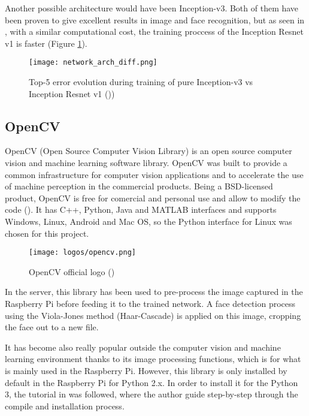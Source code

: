 	Another possible architecture would have been Inception-v3. Both of them have been proven to give excellent results in image and face recognition, but as seen in \cite{inception_resnet_article}, with a similar computational cost, the training proccess of the Inception Resnet v1 is faster (Figure \ref{fig:incep_arch_diff}).

	\begin{figure}[!ht]
		\centering
		\texttt{[image: network\_arch\_diff.png]}
		\caption{Top-5 error evolution during training of pure Inception-v3 vs Inception Resnet v1 (\cite{inception_resnet_article}))}
		\label{fig:incep_arch_diff}
	\end{figure}

	\subsection{OpenCV}
	\label{subsec:opencv}
	OpenCV (Open Source Computer Vision Library) is an open source computer vision and machine learning software library. OpenCV was built to provide a common infrastructure for computer vision applications and to accelerate the use of machine perception in the commercial products. Being a BSD-licensed product, OpenCV is free for comercial and personal use and allow to modify the code (\cite{opencv_about}). It has C++, Python, Java and MATLAB interfaces and supports Windows, Linux, Android and Mac OS, so the Python interface for Linux was chosen for this project. 

	\begin{figure}[!ht]
		\centering
		\vspace{0.2cm}
		\texttt{[image: logos/opencv.png]}
		\caption{OpenCV official logo (\cite{opencv_about})}
		\label{fig:opencv}
	\end{figure}	

	In the server, this library has been used to pre-process the image captured in the Raspberry Pi before feeding it to the trained network. A face detection process using the Viola-Jones method (Haar-Cascade) is applied on this image, cropping the face out to a new file. 

	It has become also really popular outside the computer vision and machine learning environment thanks to its image processing functions, which is for what is mainly used in the Raspberry Pi. However, this library is only installed by default in the Raspberry Pi for Python 2.x. In order to install it for the Python 3, the tutorial in \cite{opencv_for_python3} was followed, where the author guide step-by-step through the compile and installation process.


